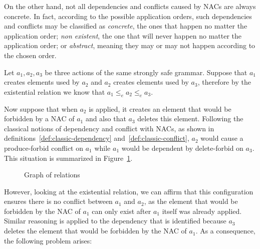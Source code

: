 On the other hand, not all dependencies and conflicts caused by NACs are always concrete. In fact, according to the possible application orders, such dependencies and conflicts may be classified as \emph{concrete}, the ones that happen no matter the application order; \emph{non existent}, the one that will never happen no matter the application order; or \emph{abstract}, meaning they may or may not happen according to the chosen order.

Let $a_1, a_2, a_3$ be three actions of the same strongly safe grammar. Suppose that $a_1$ creates elements used by $a_2$ and $a_2$ creates elements used by $a_3$, therefore by the existential relation we know that $a_1 \leq_e a_2 \leq_e a_3$.

Now suppose that when $a_2$ is applied, it creates an element that would be forbidden by a NAC of $a_1$ and also that $a_3$ deletes this element. Following the classical notions of dependency and conflict with NACs, as shown in definitions~\ref{def:classic-dependency} and~\ref{def:classic-conflict}, $a_2$ would cause a produce-forbid conflict on $a_1$ while $a_1$ would be dependent by delete-forbid on $a_3$. This situation is summarized in Figure~\ref{fig:process:order:occurrence-relation-fail}.
\begin{figure}[!ht]
  \centering
  \caption{Graph of relations}\label{fig:process:order:occurrence-relation-fail}
\end{figure}

However, looking at the existential relation, we can affirm that this configuration ensures there is no conflict between $a_1$ and $a_2$, as the element that would be forbidden by the NAC of $a_1$ can only exist after $a_1$ itself was already applied.
Similar reasoning is applied to the dependency that is identified because $a_3$ deletes the element that would be forbidden by the NAC of $a_1$. As a consequence, the following problem arises:

